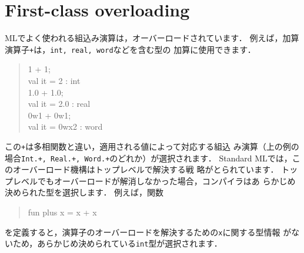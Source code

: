 \documentclass{jbook}
\newcommand{\txt}[2]{#2}
\begin{document}
\section{
\txt{第一級オーバーローディング}
    {First-class overloading}
}
\label{sec:extensionOverloading}

\ifx\jp%
	MLでよく使われる組込み演算は，オーバーロードされています．
	例えば，加算演算子{\tt +}は，{\tt int, real, word}などを含む型の
加算に使用できます．
\begin{quote}
1 + 1;\\
val it = 2 : int\\
1.0 + 1.0;\\
val it = 2.0 : real\\
0w1 + 0w1;\\
val it = 0wx2 : word
\end{quote}
	この{\tt +}は多相関数と違い，適用される値によって対応する組込
み演算（上の例の場合{\tt Int.+, Real.+, Word.+}のどれか）が選択されます．
	Standard MLでは，このオーバーロード機構はトップレベルで解決する戦
略がとられています．
	トップレベルでもオーバーロードが解消しなかった場合，コンパイラはあ
らかじめ決められた型を選択します．
	例えば，関数
\begin{quote}
fun plus x = x + x
\end{quote}
を定義すると，演算子のオーバーロードを解決するための{\tt x}に関する型情報
がないため，あらかじめ決められている{\tt int}型が選択されます．
	
\end{document}

